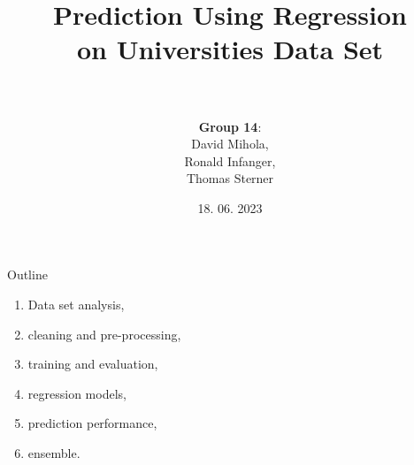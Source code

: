 \documentclass[xcolor=table]{beamer} %
\title[Prediction Using Regression on Universities Data Set]{Prediction Using Regression\\on Universities Data Set\\\normalsize \\}
\author{\textbf{Group 14}: \\David Mihola, \\Ronald Infanger, \\Thomas Sterner}
\date{18. 06. 2023}
\begin{document}



\begin{frame}
  \maketitle
\end{frame}

\begin{frame}{Outline}
  \vspace{-1cm}
  \begin{enumerate}
      \item Data set analysis,
      \item cleaning and pre-processing,
      \item training and evaluation,
      \item regression models,
      \item prediction performance,
      \item ensemble.
  \end{enumerate}
\end{frame}
\end{document}
